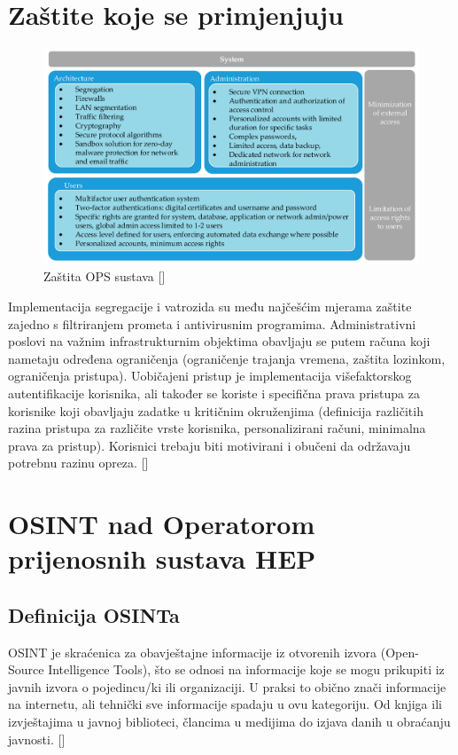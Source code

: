 \documentclass[times, utf8, zavrsni]{fer}
\begin{document}
\section{Zaštite koje se primjenjuju}
\begin{figure}[htb]
\centering
\includegraphics[width=14cm]{slike/Zastita-tso-sustava.png}
\caption{Zaštita OPS sustava  [\cite{tso-vuln}]}
\label{fig:Zastita-ops-sustava}
\end{figure}
Implementacija segregacije i vatrozida su među najčešćim mjerama zaštite zajedno s filtriranjem prometa i antivirusnim programima. Administrativni poslovi na važnim infrastrukturnim objektima obavljaju se putem računa koji nametaju određena ograničenja (ograničenje trajanja vremena, zaštita lozinkom, ograničenja pristupa). Uobičajeni pristup je implementacija višefaktorskog autentifikacije korisnika, ali također se koriste i specifična prava pristupa za korisnike koji obavljaju zadatke u kritičnim okruženjima (definicija različitih razina pristupa za različite vrste korisnika, personalizirani računi, minimalna prava za pristup). Korisnici trebaju biti motivirani i obučeni da održavaju potrebnu razinu opreza. [\cite{tso-vuln}] 

\section{OSINT nad Operatorom prijenosnih sustava HEP}
\subsection{Definicija OSINTa}
OSINT je skraćenica za obavještajne informacije iz otvorenih izvora (Open-Source Intelligence Tools), što se odnosi na informacije koje se mogu prikupiti iz javnih izvora o pojedincu/ki ili organizaciji. 
U praksi to obično znači informacije na internetu, ali tehnički sve informacije spadaju u ovu kategoriju. Od knjiga ili izvještajima u javnoj biblioteci, člancima u medijima do izjava danih u obraćanju javnosti.
[\cite{osint-def}]
\end{document}
